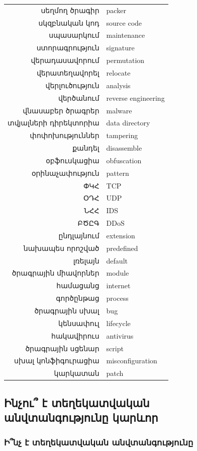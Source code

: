\documentclass[a4paper,12pt]{article}
\begin{document}
\begin{sloppypar}
\begin{tabular}{rl}
սեղմող ծրագիր&packer \\
սկզբնական կոդ&source code \\
սպասարկում&maintenance \\
ստորագրություն&signature \\
վերադասավորում&permutation \\
վերատեղավորել&relocate \\
վերլուծություն&analysis \\
վերծանում&reverse engineering \\
վնասաբեր ծրագրեր&malware \\
տվյալների դիրեկտորիա&data directory \\
փոփոխություններ&tampering \\
քանդել&disassemble \\
օբֆուսկացիա&obfuscation \\
օրինաչափություն&pattern \\
ՓԿՀ&TCP \\
ՕԴՀ&UDP \\
ՆՀՀ&IDS \\
ԲԾԸԳ&DDoS \\
ընդլայնում&extension \\
նախապես որոշված&predefined \\
լռելայն&default \\
ծրագրային միավորներ&module \\
համացանց&internet \\
գործընթաց&process \\
ծրագրային սխալ&bug \\
կենսափուլ&lifecycle \\
հակավիրուս&antivirus \\
ծրագրային սցենար&script \\
սխալ կոնֆիգուրացիա&misconfiguration \\
կարկատան&patch \\
\end{tabular}


\subsection{Ինչու՞ է տեղեկատվական անվտանգությունը կարևոր}


\subsubsection{Ի՞նչ է տեղեկատվական անվտանգությունը}


\end{sloppypar}
\end{document}
